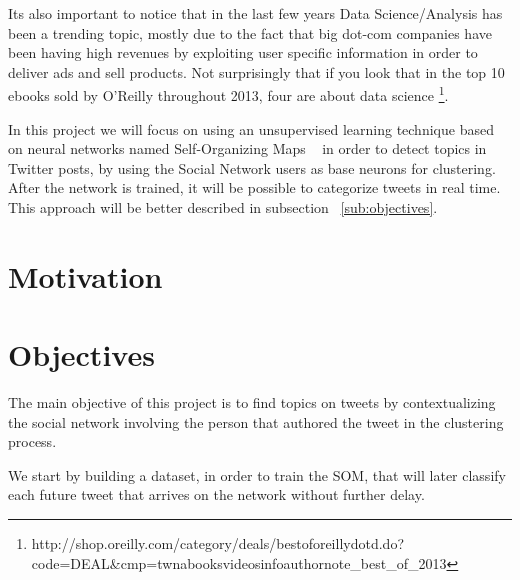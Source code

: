 Its also important to notice that in the last few years Data Science/Analysis has been a trending topic, mostly due to the fact that big dot-com companies have been having high revenues by exploiting user specific information in order to deliver ads and sell products. Not surprisingly that if you look that in the top 10 ebooks sold by O'Reilly throughout 2013, four are about data science \footnote{http://shop.oreilly.com/category/deals/best\-of\-oreilly\-dotd.do?code=DEAL\&cmp=tw\-na\-books\-videos\-info\-authornote\_best\_of\_2013}.

In this project we will focus on using an unsupervised learning technique based on neural networks named Self-Organizing Maps ~\cite{Kohonen1990} in order to detect topics in Twitter posts, by using the Social Network users as base neurons for clustering. After the network is trained, it will be possible to categorize tweets in real time. This approach will be better described in subsection ~\ref{sub:objectives}.

 

\section{Motivation}


\section{Objectives}

The main objective of this project is to find topics on tweets by contextualizing the social network involving the person that authored the tweet in the clustering process.

We start by building a dataset, in order to train the \ac{SOM}, that will later classify each future tweet that arrives on the network without further delay.

